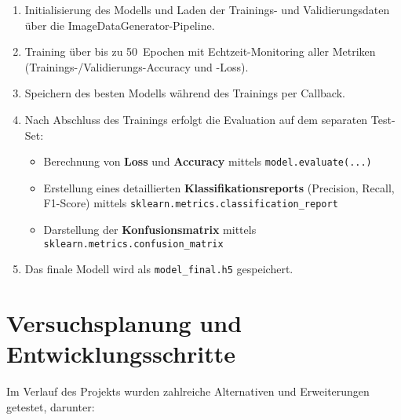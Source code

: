 \begin{enumerate}
    \item Initialisierung des Modells und Laden der Trainings- und Validierungsdaten über die ImageDataGenerator-Pipeline.
    \item Training über bis zu 50~Epochen mit Echtzeit-Monitoring aller Metriken (Trainings-/Validierungs-Accuracy und -Loss).
    \item Speichern des besten Modells während des Trainings per Callback.
    \item Nach Abschluss des Trainings erfolgt die Evaluation auf dem separaten Test-Set:
        \begin{itemize}
            \item Berechnung von \textbf{Loss} und \textbf{Accuracy} mittels \texttt{model.evaluate(...)}
            \item Erstellung eines detaillierten \textbf{Klassifikationsreports} (Precision, Recall, F1-Score) mittels \texttt{sklearn.metrics.classification\_report}
            \item Darstellung der \textbf{Konfusionsmatrix} mittels \texttt{sklearn.metrics.confusion\_matrix}
        \end{itemize}
    \item Das finale Modell wird als \texttt{model\_final.h5} gespeichert.
\end{enumerate}

\section{Versuchsplanung und Entwicklungsschritte}

Im Verlauf des Projekts wurden zahlreiche Alternativen und Erweiterungen getestet, darunter:


